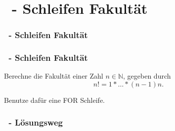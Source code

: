 \def\stitle{\theexercise\ - Schleifen Fakultät}
\section{\stitle}
\begin{frame}
  \frametitle{\stitle}%
\tableofcontents[current]
\end{frame}

\begin{frame}[t]%
    \frametitle{\stitle}

Berechne die Fakultät einer Zahl $n\in\mathbb{N}$, gegeben durch $$n!=1*\ldots*(n-1)n.$$

Benutze dafür eine FOR Schleife.
\end{frame}


\begin{frame}[fragile]%
 \frametitle{\theexercise\ - L\"osungsweg}%

\end{frame}
